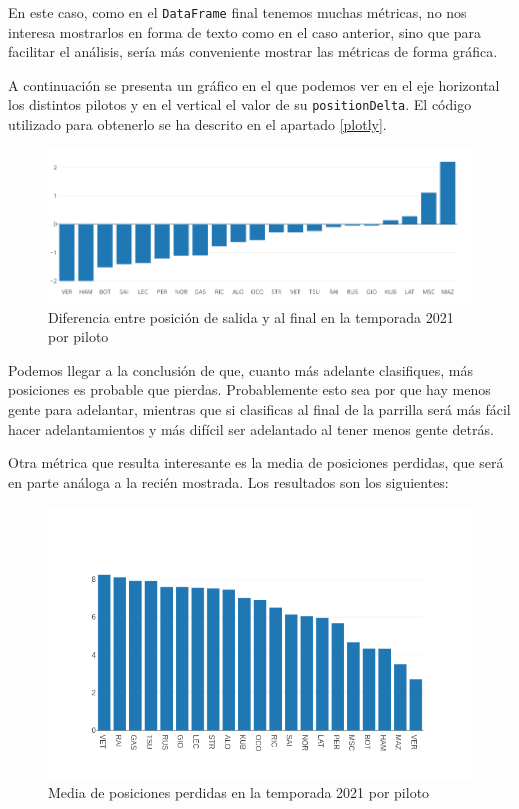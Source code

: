 \documentclass[12pt,twoside,titlepage]{report}
\begin{document}
En este caso, como en el \texttt{DataFrame} final tenemos muchas métricas, no nos interesa mostrarlos en forma de texto como en el caso anterior, sino que para facilitar el análisis, sería más conveniente mostrar las métricas de forma gráfica.

A continuación se presenta un gráfico en el que podemos ver en el eje horizontal los distintos pilotos y en el vertical el valor de su \texttt{positionDelta}. El código utilizado para obtenerlo se ha descrito en el apartado \ref{plotly}.

\begin{figure}[H]
	\includegraphics[scale=0.35]{results/seasonanalysis/positionDelta.png}
	\centering
	\caption{Diferencia entre posición de salida y al final en la temporada 2021 por piloto}
	\label{fig:positionDelta2}
	\centering
\end{figure}

Podemos llegar a la conclusión de que, cuanto más adelante clasifiques, más posiciones es probable que pierdas. Probablemente esto sea por que hay menos gente para adelantar, mientras que si clasificas al final de la parrilla será más fácil hacer adelantamientos y más difícil ser adelantado al tener menos gente detrás.

Otra métrica que resulta interesante es la media de posiciones perdidas, que será en parte análoga a la recién mostrada. Los resultados son los siguientes:

\begin{figure}[H]
	\includegraphics[scale=0.4]{results/seasonanalysis/avgpositionslost2021.png}
	\centering
	\caption{Media de posiciones perdidas en la temporada 2021 por piloto}
	\label{fig:avgPosLost2021}
	\centering
\end{figure}
\end{document}
